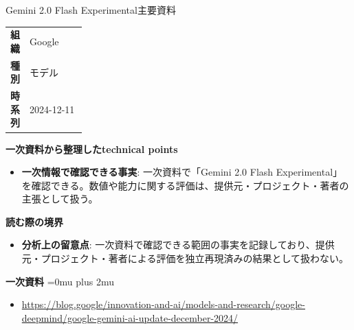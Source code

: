 \begin{technicalnote}{Gemini 2.0 Flash Experimental}{主要資料}
\begingroup
\begin{tabularx}{\linewidth}{@{}>{\bfseries}p{0.22\linewidth}X@{}}
組織 & Google \\
種別 & モデル \\
時系列 & 2024-12-11 \\
\end{tabularx}
\smallskip
{\bfseries 一次資料から整理したtechnical points}
\begin{itemize}[leftmargin=1.5em,itemsep=0.35em]
\item \textbf{一次情報で確認できる事実}: 一次資料で「Gemini 2.0 Flash Experimental」を確認できる。数値や能力に関する評価は、提供元・プロジェクト・著者の主張として扱う。
\end{itemize}
\begin{minipage}{\linewidth}
{\bfseries 読む際の境界}
\begin{itemize}[leftmargin=1.5em,itemsep=0.35em]
\item \textbf{分析上の留意点}: 一次資料で確認できる範囲の事実を記録しており、提供元・プロジェクト・著者による評価を独立再現済みの結果として扱わない。
\end{itemize}
\begin{samepage}
{\bfseries 一次資料}
\begingroup\sloppy
\Urlmuskip=0mu plus 2mu\relax
\begin{itemize}[leftmargin=1.5em,itemsep=0.25em]
\item {\scriptsize\url{https://blog.google/innovation-and-ai/models-and-research/google-deepmind/google-gemini-ai-update-december-2024/}}
\end{itemize}
\endgroup
\end{samepage}
\end{minipage}
\endgroup
\end{technicalnote}
\medskip

